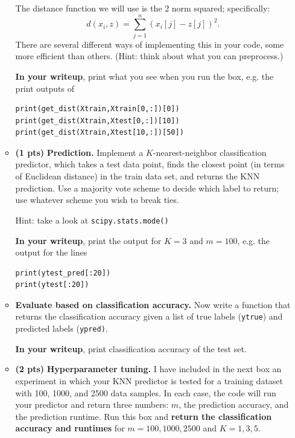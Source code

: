 \documentclass{article}
\newcommand{\showpoints}[1]{\textbf{(#1)}}
\begin{document}
\begin{enumerate}
\begin{itemize}
The distance function we will use is the 2 norm squared; specifically:
\[
d(x_i,z) = \sum_{j=1}^n (x_i[j]-z[j])^2.
\]
There are several different ways of implementing this in your code, some more efficient than others. (Hint: think about what you can preprocess.)

\textbf{In your writeup}, print what you see when you run the box, e.g. the print outputs of

\begin{verbatim}
print(get_dist(Xtrain,Xtrain[0,:])[0])
print(get_dist(Xtrain,Xtest[0,:])[10])
print(get_dist(Xtrain,Xtest[10,:])[50])
\end{verbatim}



\item  \showpoints{1 pts}  \textbf{Prediction.} Implement a $K$-nearest-neighbor classification predictor, which takes a test data point, finds the closest point (in terms of Euclidean distance) in the train data set, and returns the KNN prediction. Use a majority vote scheme to decide which label to return; use whatever scheme you wish to break ties. 

Hint: take a look at \texttt{scipy.stats.mode()}

\textbf{In your writeup}, print the  output for $K=3$ and $m = 100$, e.g. the output for the lines

\begin{verbatim}
print(ytest_pred[:20])
print(ytest[:20])
\end{verbatim}



\item \textbf{Evaluate based on classification accuracy.} Now write a function that returns the classification accuracy given a list of true labels (\texttt{ytrue}) and predicted labels (\texttt{ypred)}. 


\textbf{In your writeup}, print classification accuracy of the test set.


\item  \showpoints{2 pts}  \textbf{Hyperparameter tuning.}  I have included in the next box an experiment in which your KNN predictor is tested for a training dataset with 100, 1000, and 2500 data samples. In each case, the code will run your predictor and return three numbers: $m$, the prediction accuracy, and the prediction runtime. Run this box and \textbf{return the classification accuracy and runtimes} for $m = 100,1000,2500$ and $K = 1,3,5$.


\end{itemize}
\end{enumerate}
\end{document}

